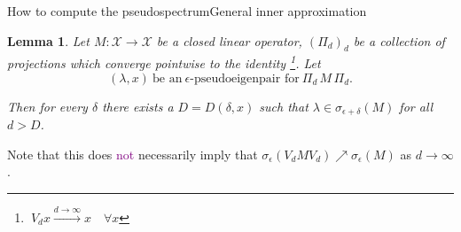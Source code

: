 \documentclass[
  english,            %
  aspectratio=169,    %
]{tumbeamer}
\newtheorem{lemma}{Lemma}
\newenvironment{emphbox}
  {\begin{tcolorbox}[colback=blue!5!white,colframe=blue!75!black]}
  {\end{tcolorbox}}
\newcommand{\cX}{\mathcal{X}}
\renewcommand{\emph}[1]{\textcolor{purple}{#1}}
\begin{document}
\begin{frame}{How to compute the pseudospectrum}{General inner approximation}
  
\begin{lemma}
  Let $M : \cX \to \cX$ be a closed linear operator, $(\Pi_d)_d$ be a collection of projections which converge pointwise to the identity \footnote{$\ V_d x \xrightarrow{d \to \infty} x \quad \forall x$}. Let 
  \begin{equation}
    (\lambda, x)\ \text{be an}\ \epsilon \text{-pseudoeigenpair for}\ \Pi_d\, M\, \Pi_d. 
  \end{equation}
  
  Then for every $\delta$ there exists a $D = D(\delta, x)$ such that $\lambda \in \sigma_{\epsilon + \delta} (M)$ for all $d > D$. 
\end{lemma}

\begin{emphbox}
  Note that this does \emph{not} necessarily imply that $\sigma_\epsilon (V_d M V_d) \nearrow \sigma_\epsilon (M)$ as $d \to \infty$.  
\end{emphbox}

\end{frame}
\end{document}
